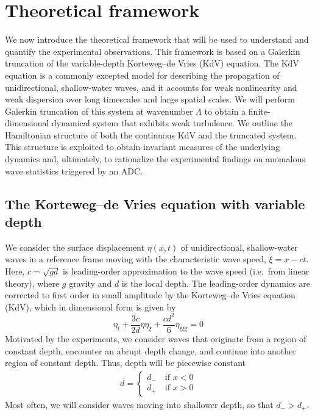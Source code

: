 \documentclass[11pt]{article}
\newcommand{\depth}{d}
\newcommand{\dup}{\depth_{-}}
\newcommand{\ddn}{\depth_{+}}
\begin{document}
\section{Theoretical framework}

We now introduce the theoretical framework that will be used to understand and quantify the experimental observations. This framework is based on a Galerkin truncation of the variable-depth Korteweg–de Vries (KdV) equation. The KdV equation is a commonly excepted model for describing the propagation of unidirectional, shallow-water waves, and it accounts for weak nonlinearity and weak dispersion over long timescales and large spatial scales. We will perform Galerkin truncation of this system at wavenumber $\Lambda$ to obtain a finite-dimensional dynamical system that exhibits weak turbulence. We outline the Hamiltonian structure of both the continuous KdV and the truncated system. This structure is exploited to obtain invariant measures of the underlying dynamics and, ultimately, to rationalize the experimental findings on anomalous wave statistics triggered by an ADC.


\subsection{The Korteweg–de Vries equation with variable depth}

We consider the surface displacement $\eta(x,t)$ of unidirectional, shallow-water waves in a reference frame moving with the characteristic wave speed, $\xi = x - ct$. Here, $c = \sqrt{g \depth}$ is leading-order approximation to the wave speed (i.e.~from linear theory), where $g$ gravity and $\depth$ is the local depth.
The leading-order dynamics are corrected to first order in small amplitude by the Korteweg–de Vries equation (KdV), which in dimensional form is given by \cite{whitham2011linear}
\begin{equation}
\label{KdV}
\eta_t + \frac{3 c}{2 \depth} \eta \eta_{\xi} + \frac{c \depth^2}{6} \eta_{\xi \xi \xi} = 0
\end{equation}
Motivated by the experiments, we consider waves that originate from a region of constant depth, encounter an abrupt depth change, and continue into another region of constant depth. Thus, depth will be piecewise constant
\begin{align}
\depth = 
\begin{cases}
\dup \quad \mbox{if } x<0 \\
\ddn \quad \mbox{if } x>0
\end{cases}
\end{align}
Most often, we will consider waves moving into shallower depth, so that $\dup > \ddn$. 
\end{document}
